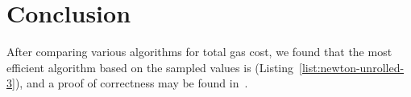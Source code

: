 \section{Conclusion}

After comparing various algorithms for total gas cost,
we found that the most efficient algorithm based on the sampled values is
\UnrolledThree{} (Listing~\ref{list:newton-unrolled-3}),
and a proof of correctness may be found in~\cite[Appendix B]{EfficientIsqrt}.
